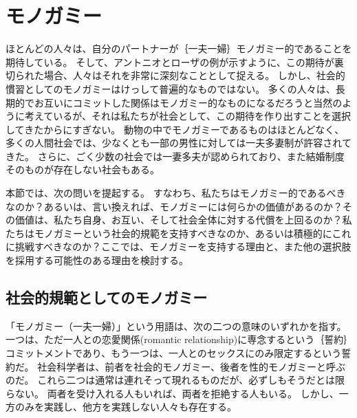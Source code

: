 \documentclass[paper=a4,book,openany]{jlreq}
\begin{document}
\section{モノガミー}

ほとんどの人々は、自分のパートナーが｛一夫一婦｝{モノガミー}的であることを期待している。
そして、アントニオとローザの例が示すように、この期待が裏切られた場合、人々はそれを非常に深刻なこととして捉える。
しかし、社会的慣習としてのモノガミーはけっして普遍的なものではない。
多くの人々は、長期的でお互いにコミットした関係はモノガミー的なものになるだろうと当然のように考えているが、それは私たちが社会として、この期待を作り出すことを選択してきたからにすぎない。
動物の中でモノガミーであるものはほとんどなく、多くの人間社会では、少なくとも一部の男性に対しては一夫多妻制が許容されてきた。
さらに、ごく少数の社会では一妻多夫が認められており、また結婚制度そのものが存在しない社会もある。

本節では、次の問いを提起する。
すなわち、私たちはモノガミー的であるべきなのか？あるいは、言い換えれば、モノガミーには何らかの価値があるのか？その価値は、私たち自身、お互い、そして社会全体に対する代償を上回るのか？私たちはモノガミーという社会的規範を支持すべきなのか、あるいは積極的にこれに挑戦すべきなのか？ここでは、モノガミーを支持する理由と、また他の選択肢を採用する可能性のある理由を検討する。

\subsection{社会的規範としてのモノガミー}

「{モノガミー}（一夫一婦）」という用語は、次の二つの意味のいずれかを指す。
一つは、ただ一人との恋愛関係(romantic relationship)に専念するという｛誓約｝{コミットメント}であり、もう一つは、一人とのセックスにのみ限定するという誓約だ。
社会科学者は、前者を社会的モノガミー、後者を性的モノガミーと呼ぶのだ。
これら二つは通常は連れそって現れるものだが、必ずしもそうだとは限らない。
両者を受け入れる人もいれば、両者を拒絶する人もいる。
しかし、一方のみを実践し、他方を実践しない人々も存在する。
\end{document}
